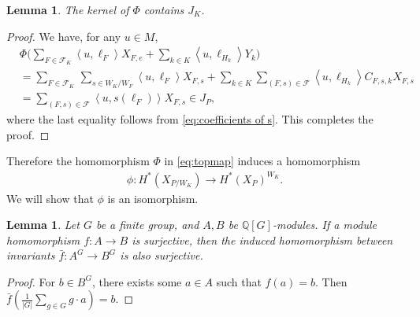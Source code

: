 \documentclass{amsart}
\theoremstyle{plain} \numberwithin{equation}{section}
\newtheorem{lemma}[theorem]{Lemma}
\theoremstyle{definition}
\newcommand{\Q}{\mathbb{Q}}
\newcommand{\ip}[1]{\left\langle #1 \right\rangle}
\begin{document}
\begin{lemma}
  The kernel of $\Phi$ contains $J_K$.
\end{lemma}
\begin{proof}
  We have, for any $u\in M$,
  \begin{align*}
    &\Phi\biggl(\sum_{F\in\mathcal{F}_K}\ip{u,\ell_{F}}X_{F,e}+\sum_{k\in K}\ip{u,\ell_{H_k}}Y_k\biggr)\\
    &=\sum_{F\in\mathcal{F}_K}\,\sum_{s\in{W_K}/{W_F}}\ip{u,\ell_{F}}X_{F,s}+\sum_{k\in K}\sum_{(F,s)\in\mathcal{F}}\ip{u,\ell_{H_k}}C_{F,s,k}X_{F,s}\\
    &=\sum_{(F,s)\in\mathcal{F}}\ip{u,s(\ell_{F})}X_{F,s}\in J_P,
  \end{align*}
  where the last equality follows from \cref{eq:coefficients of s}. This completes the proof.
\qedhere
\end{proof}

Therefore the homomorphism $\Phi$ in \cref{eq:topmap} induces a homomorphism 
\begin{align}\label{eq:base map}
  \phi: H^*({X_{P/W_K}})\to H^*(X_{P})^{W_K}.
\end{align}
We will show that $\phi$ is an isomorphism. 


\begin{lemma}\label{lem:equiv surjection} Let $G$ be a finite group, and $A,B$ be $\Q[G]$-modules. If a module homomorphism $f:A\to B$ is surjective, then the induced homomorphism between invariants $\bar{f}:A^G\to B^G$ is also surjective. 
\end{lemma} 
\begin{proof} 
  For $b\in B^G$, there exists some $a\in A$ such that $f(a)=b$. Then $\bar{f}\left(\frac{1}{|G|}\sum_{g\in G}g\cdot a\right)=b$. 
  \qedhere 
\end{proof}
\end{document}
